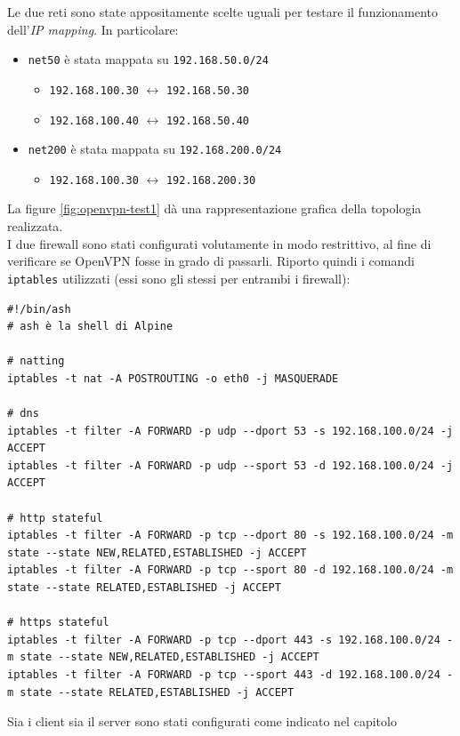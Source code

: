 Le due reti sono state appositamente scelte uguali per testare il funzionamento
dell'\textit{IP mapping}. In particolare:
\begin{itemize}
  \item \texttt{net50} è stata mappata su \texttt{192.168.50.0/24}
  \begin{itemize}
    \item \texttt{192.168.100.30} $\leftrightarrow$ \texttt{192.168.50.30}
    \item \texttt{192.168.100.40} $\leftrightarrow$ \texttt{192.168.50.40}
  \end{itemize}
  \item \texttt{net200} è stata mappata su \texttt{192.168.200.0/24}
  \begin{itemize}
    \item \texttt{192.168.100.30} $\leftrightarrow$ \texttt{192.168.200.30}
  \end{itemize}
\end{itemize}
La figure \ref{fig:openvpn-test1} dà una rappresentazione grafica della topologia
realizzata.\\
I due firewall sono stati configurati volutamente in modo restrittivo, al fine
di verificare se OpenVPN fosse in grado di passarli. Riporto quindi i comandi
\texttt{iptables} utilizzati (essi sono gli stessi per entrambi i firewall):
\begin{verbatim}
#!/bin/ash
# ash è la shell di Alpine

# natting
iptables -t nat -A POSTROUTING -o eth0 -j MASQUERADE

# dns
iptables -t filter -A FORWARD -p udp --dport 53 -s 192.168.100.0/24 -j ACCEPT
iptables -t filter -A FORWARD -p udp --sport 53 -d 192.168.100.0/24 -j ACCEPT

# http stateful
iptables -t filter -A FORWARD -p tcp --dport 80 -s 192.168.100.0/24 -m state --state NEW,RELATED,ESTABLISHED -j ACCEPT
iptables -t filter -A FORWARD -p tcp --sport 80 -d 192.168.100.0/24 -m state --state RELATED,ESTABLISHED -j ACCEPT

# https stateful
iptables -t filter -A FORWARD -p tcp --dport 443 -s 192.168.100.0/24 -m state --state NEW,RELATED,ESTABLISHED -j ACCEPT
iptables -t filter -A FORWARD -p tcp --sport 443 -d 192.168.100.0/24 -m state --state RELATED,ESTABLISHED -j ACCEPT
\end{verbatim}
Sia i client sia il server sono stati configurati come indicato nel capitolo
